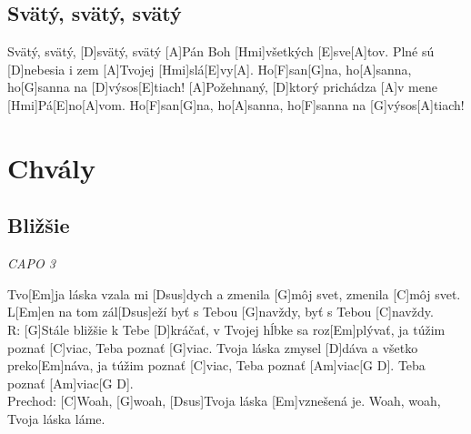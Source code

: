 \documentclass[10pt]{article}
\begin{document}
\begin{Large}
\begin{multicols}{2}
\begin{minipage}{\textwidth}
\subsection{Svätý, svätý, svätý}
\begin{guitar}
	[A]Svätý, svätý, [D]svätý, svätý [A]Pán Boh [Hmi]všetkých [E]sve[A]tov.
	Plné sú [D]nebesia i zem [A]Tvojej [Hmi]slá[E]vy[A].
	Ho[F]san[G]na, ho[A]sanna, ho[G]sanna na [D]výsos[E]tiach!
	[A]Požehnaný, [D]ktorý prichádza [A]v mene [Hmi]Pá[E]no[A]vom.
	Ho[F]san[G]na, ho[A]sanna, ho[F]sanna na [G]výsos[A]tiach!
\end{guitar}
\end{minipage}
\end{multicols}

\newpage

\begin{minipage}{\textwidth}
\section{Chvály}
\subsection{Bližšie}
\textit{CAPO 3}
\begin{multicols*}{2}
\begin{guitar}	
	Tvo[Em]ja láska vzala mi [Dsus]dych
	a zmenila [G]môj svet,
	zmenila [C]môj svet.
	\\
	L[Em]en na tom zál[Dsus]eží
	byť s Tebou [G]navždy,
	byť s Tebou [C]navždy.
	\\
	R: [G]Stále bližšie k Tebe [D]kráčať,
	v Tvojej hĺbke sa roz[Em]plývať,
	ja túžim poznať [C]viac,
	Teba poznať [G]viac.
	\columnbreak
	Tvoja láska zmysel [D]dáva
	a všetko preko[Em]náva,
	ja túžim poznať [C]viac,
	Teba poznať [Am]viac[G D].
	Teba poznať [Am]viac[G D].
	\\
	Prechod:
	[C]Woah, [G]woah,
	[Dsus]Tvoja láska [Em]vznešená je.
	Woah, woah,
	Tvoja láska láme.
\end{guitar}
\end{multicols*}
\end{minipage}

\begin{minipage}{\textwidth}

\end{minipage}
\end{Large}
\end{document}
